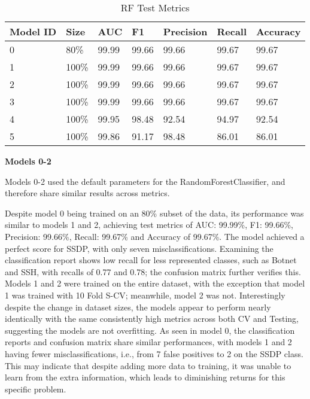 \begin{table}[h]
\centering
\caption{RF Test Metrics}
\label{tab:rf-test-metrics}
\begin{tabular}{|l|l|l|l|l|l|l|}
\hline
\textbf{Model ID} & \textbf{Size} & \textbf{AUC} & \textbf{F1} & \textbf{Precision} & \textbf{Recall} & \textbf{Accuracy}  \\ \hline
0 & 80\% & 99.99 & 99.66 & 99.66 & 99.67 & 99.67 \\ \hline
1 & 100\% & 99.99 & 99.66 & 99.66 & 99.67 & 99.67 \\ \hline
2 & 100\% & 99.99 & 99.66 & 99.66 & 99.67 & 99.67 \\ \hline
3 & 100\% & 99.99 & 99.66 & 99.66 & 99.67 & 99.67 \\ \hline
4 & 100\% & 99.95 & 98.48 &	92.54 & 94.97 &	92.54 \\ \hline
5 & 100\% & 99.86 & 91.17 & 98.48 & 86.01 & 86.01 \\ \hline
\end{tabular}
\end{table}

\textbf{Models 0-2}

\smallskip
Models 0-2 used the default parameters for the RandomForestClassifier, and therefore share similar results across metrics.

Despite model 0 being trained on an 80\% subset of the data, its performance was similar to models 1 and 2, achieving test metrics of AUC: 99.99\%, F1: 99.66\%, Precision: 99.66\%, Recall: 99.67\% and Accuracy of 99.67\%. The model achieved a perfect score for SSDP, with only seven misclassifications. Examining the classification report shows low recall for less represented classes, such as Botnet and SSH, with recalls of 0.77 and 0.78; the confusion matrix further verifies this. 
Models 1 and 2 were trained on the entire dataset, with the exception that model 1 was trained with 10 Fold S-CV; meanwhile, model 2 was not. Interestingly despite the change in dataset sizes, the models appear to perform nearly identically with the same consistently high metrics across both CV and Testing, suggesting the models are not overfitting. As seen in model 0, the classification reports and confusion matrix share similar performances, with models 1 and 2 having fewer misclassifications, i.e., from 7 false positives to 2 on the SSDP class. This may indicate that despite adding more data to training, it was unable to learn from the extra information, which leads to diminishing returns for this specific problem. 
 
